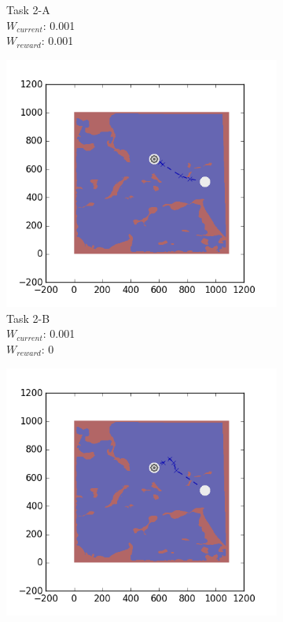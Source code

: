 \documentclass{tamuccthesis}
\begin{document}
\begin{figure}[H]
\begin{subfigure}[b]{0.24\textwidth}
        \caption{{\small Task 2-A \\ $W_{current}$: 0.001 \\ $W_{reward}$: 0.001}}   
        \label{fig:Path_2-A_upCurrent_Reward}
    \end{subfigure}
  \begin{subfigure}[b]{0.24\textwidth}
        \centering
        \includegraphics[width=\textwidth,trim={4cm 3cm 2cm 3cm},clip]{EXP3RG_PathBb_-1_-1_0d001_0.png}
        \caption{{\small Task 2-B \\ $W_{current}$: 0.001 \\ $W_{reward}$: 0}}    
        \label{fig:Path_2-B_upCurrent_noReward}
    \end{subfigure}
    \begin{subfigure}[b]{0.24\textwidth}  
        \centering 
        \includegraphics[width=\textwidth,trim={4cm 3cm 2cm 3cm},clip]{EXP3RG_PathBb_-1_-1_0d001_-1.png}

\end{subfigure}
\end{figure}
\end{document}

